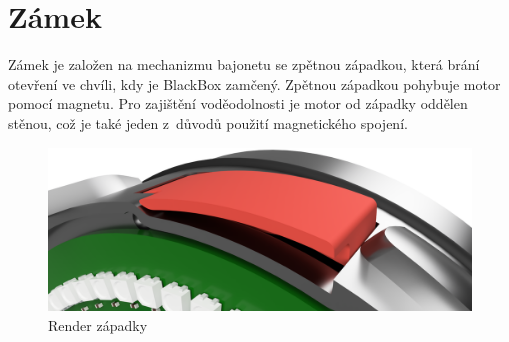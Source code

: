\section{Zámek}
\label{zamek}

Zámek je založen na mechanizmu bajonetu se zpětnou západkou, která brání otevření ve chvíli, kdy je BlackBox zamčený.
Zpětnou západkou pohybuje motor pomocí magnetu. Pro zajištění vodě\-o\-dol\-nos\-ti je motor od západky oddělen stěnou, 
což je také jeden z~důvodů použití magne\-tic\-ké\-ho spojení.

\begin{figure}[h]
    \centering
    \includegraphics[width=\textwidth]{kapitoly/obrazky/E4/zapadka/render.png}
    \caption{Render západky}

    \label{fig:E4-zapadka}
\end{figure}

%   
%   



